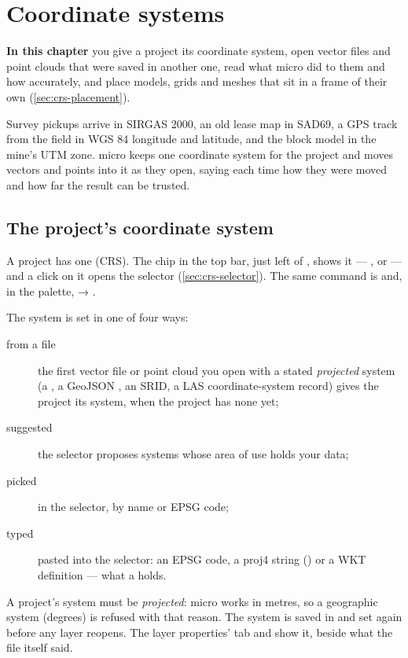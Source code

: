 \chapter{Coordinate systems}\label{ch:crs}
\begin{goals}
\textbf{In this chapter} you give a project its coordinate system, open vector files and point clouds that
were saved in another one, read what micro did to them and how accurately, and place models, grids and
meshes that sit in a frame of their own (\cref{sec:crs-placement}).
\end{goals}

Survey pickups arrive in SIRGAS 2000, an old lease map in SAD69, a GPS track from the field in WGS 84
longitude and latitude, and the block model in the mine's UTM zone. micro keeps one coordinate system
for the project and moves vectors and points into it as they open, saying each time how they were
moved and how far the result can be trusted.

\section{The project's coordinate system}\label{sec:crs-project}

A project has one  (CRS). The chip in the top bar, just left of
, shows it — , or  — and a click on it opens the selector
(\cref{sec:crs-selector}). The same command is  and, in the palette,
 → .

The system is set in one of four ways:
\begin{description}
\item[from a file] the first vector file or point cloud you open with a stated \emph{projected} system (a
  , a GeoJSON , an SRID, a LAS coordinate-system record) gives the project its
  system, when the project has none yet;
\item[suggested] the selector proposes systems whose area of use holds your data;
\item[picked] in the selector, by name or EPSG code;
\item[typed] pasted into the selector: an EPSG code, a proj4 string () or a WKT
  definition — what a  holds.
\end{description}

A project's system must be \emph{projected}: micro works in metres, so a geographic system (degrees) is
refused with that reason. The system is saved in  and set again before any layer
reopens. The layer properties'  tab and  show it, beside what the file
itself said.


